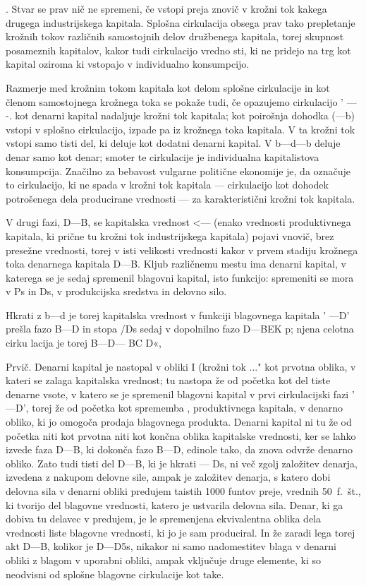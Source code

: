 \documentclass[kapital_02.tex]{subfiles}
\begin{document}
. Stvar se prav nič ne spremeni, če vstopi preja znovič v krožni tok kakega drugega industrijskega kapitala. Splošna cirkulacija obsega prav tako prepletanje krožnih tokov različnih samostojnih delov družbenega kapitala, torej skupnost posameznih kapitalov, kakor tudi cirkulacijo vredno sti, ki ne pridejo na trg kot kapital oziroma ki vstopajo v individualno konsumpcijo.

Razmerje med krožnim tokom kapitala kot delom splošne cirkulacije in kot členom samostojnega krožnega toka se pokaže tudi, če opazujemo cirkulacijo \KPED' — \KPED -\KPEd. \KPED kot denarni kapital nadaljuje krožni tok kapitala; \KPEd kot poirošnja dohodka (\KPEd —b) vstopi v splošno cirkulacijo, izpade pa iz krožnega toka kapitala. V ta krožni tok vstopi samo tisti del, ki deluje kot dodatni denarni kapital. V b—d—b deluje denar samo kot denar; smoter te cirkulacije je individualna kapitalistova konsumpcija. Značilno za bebavost vulgarne politične ekonomije je, da označuje to cirkulacijo, ki ne spada v krožni tok kapitala — cirkulacijo kot dohodek potrošenega dela producirane vrednosti — za karakteristični krožni tok kapitala.

V drugi fazi, D—B, se kapitalska vrednost \KPED <— \KPEP (enako vrednosti produktivnega kapitala, ki prične tu krožni tok industrijskega kapitala) pojavi vnovič, brez presežne vrednosti, torej v isti velikosti vrednosti kakor v prvem stadiju krožnega toka denarnega kapitala D—B. Kljub različnemu mestu ima denarni kapital, v katerega se je sedaj spremenil blagovni kapital, isto funkcijo: spremeniti se mora v Ps in Ds, v produkcijska sredstva in delovno silo.

Hkrati z b—d je torej kapitalska vrednost v funkciji blagovnega kapitala \KPEB' —D' prešla fazo B—D in stopa /Ds sedaj v dopolnilno fazo D—BEK p; njena celotna cirku lacija je torej B—D— BC D«,

Prvič. Denarni kapital \KPED je nastopal v obliki I (krožni tok \KPED...\KPED" kot prvotna oblika, v kateri se zalaga kapitalska vrednost; tu nastopa že od početka kot del tiste denarne vsote, v katero se je spremenil blagovni kapital v prvi cirkulacijski fazi \KPEB' —D', torej že od početka kot sprememba \KPEP, produktivnega kapitala, v denarno obliko, ki jo omogoča prodaja blagovnega produkta. Denarni kapital ni tu že od početka niti kot prvotna niti kot končna oblika kapitalske vrednosti, ker se lahko izvede faza D—B, ki dokonča fazo B—D, edinole tako, da znova odvrže denarno obliko. Zato tudi tisti del D—B, ki je hkrati \KPED — Ds, ni več zgolj založitev denarja, izvedena z nakupom delovne sile, ampak je založitev denarja, s katero dobi delovna sila v denarni obliki predujem taistih 1000 funtov preje, vrednih 50~f.~št., ki tvorijo del blagovne vrednosti, katero je ustvarila delovna sila. Denar, ki ga dobiva tu delavec v predujem, je le spremenjena ekvivalentna oblika dela vrednosti liste blagovne vrednosti, ki jo je sam produciral. In že zaradi lega torej akt D—B, kolikor je D—D5s, nikakor ni samo nadomestitev blaga v denarni obliki z blagom v uporabni obliki, ampak vključuje druge elemente, ki so neodvisni od splošne blagovne cirkulacije kot take.
\end{document}
